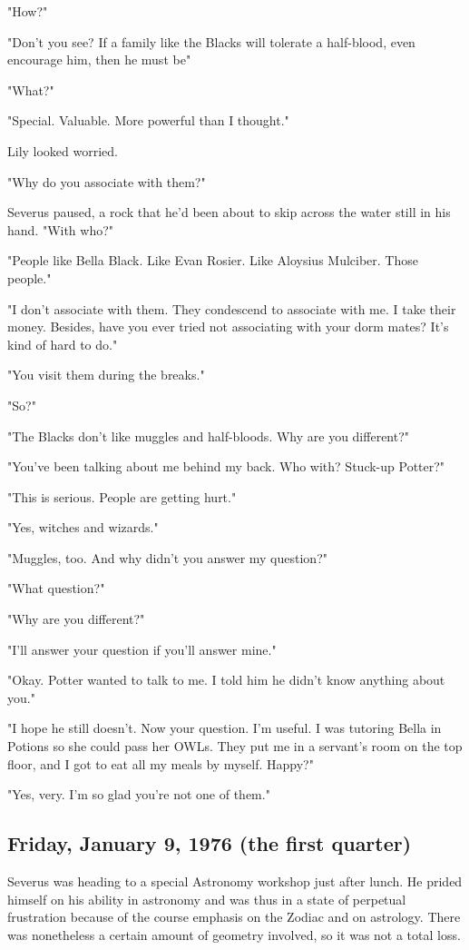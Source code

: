 "How?"

"Don't you see? If a family like the Blacks will tolerate a half-blood, even encourage him, then he must be{\el}"

"What?"

"Special. Valuable. More powerful than I thought."

Lily looked worried.

"Why do you associate with them?"

Severus paused, a rock that he'd been about to skip across the water still in his hand. "With who?"

"People like Bella Black. Like Evan Rosier. Like Aloysius Mulciber. Those people."

"I don't associate with them. They condescend to associate with me. I take their money. Besides, have you ever tried not associating with your dorm mates? It's kind of hard to do."

"You visit them during the breaks."

"So?"

"The Blacks don't like muggles and half-bloods. Why are you different?"

"You've been talking about me behind my back. Who with? Stuck-up Potter?"

"This is serious. People are getting hurt."

"Yes, witches and wizards."

"Muggles, too. And why didn't you answer my question?"

"What question?"

"Why are you different?"

"I'll answer your question if you'll answer mine."

"Okay. Potter wanted to talk to me. I told him he didn't know anything about you."

"I hope he still doesn't. Now your question. I'm useful. I was tutoring Bella in Potions so she could pass her OWLs. They put me in a servant's room on the top floor, and I got to eat all my meals by myself. Happy?"

"Yes, very. I'm so glad you're not one of them."

\subsection{Friday, January 9, 1976 (the first quarter)}

Severus was heading to a special Astronomy workshop just after lunch. He prided himself on his ability in astronomy and was thus in a state of perpetual frustration because of the course emphasis on the Zodiac and on astrology. There was nonetheless a certain amount of geometry involved, so it was not a total loss.

